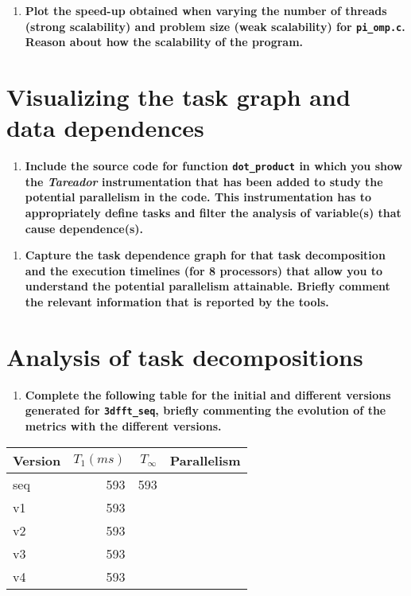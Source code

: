 \documentclass[a4paper]{article}
\begin{document}
\begin{enumerate}[resume]
	\item \textbf{Plot the speed-up obtained when varying the number of threads (strong scalability) and problem size (weak scalability) for \texttt{pi\_omp.c}. Reason about how the scalability of the program.}
\end{enumerate}

\section*{Visualizing the task graph and data dependences}

\begin{enumerate}[resume]
	\item \textbf{Include the source code for function \texttt{dot\_product} in which you show the \textit{Tareador} instrumentation that has been added to study the potential parallelism in the code. This instrumentation has to appropriately define tasks and filter the analysis of variable(s) that cause dependence(s).}
\end{enumerate}

\begin{enumerate}[resume]
	\item \textbf{Capture the task dependence graph for that task decomposition and the execution timelines (for 8 processors) that allow you to understand the potential parallelism attainable. Briefly comment the relevant information that is reported by the tools.}
\end{enumerate}

\section*{Analysis of task decompositions}

\begin{enumerate}[resume]
	\item \textbf{Complete the following table for the initial and different versions generated for \texttt{3dfft\_seq}, briefly commenting the evolution of the metrics with the different versions.}
\end{enumerate}

\begin{center}
	\begin{tabular}{l|rrr}
		Version & $T_1(ms)$ & $T_{\infty}$ & Parallelism \\
		\hline
		seq & 593 & 593 & \\
		v1 & 593 & & \\
		v2 & 593 & & \\
		v3 & 593 & & \\
		v4 & 593 & & 
	\end{tabular}
\end{center}
\end{document}
